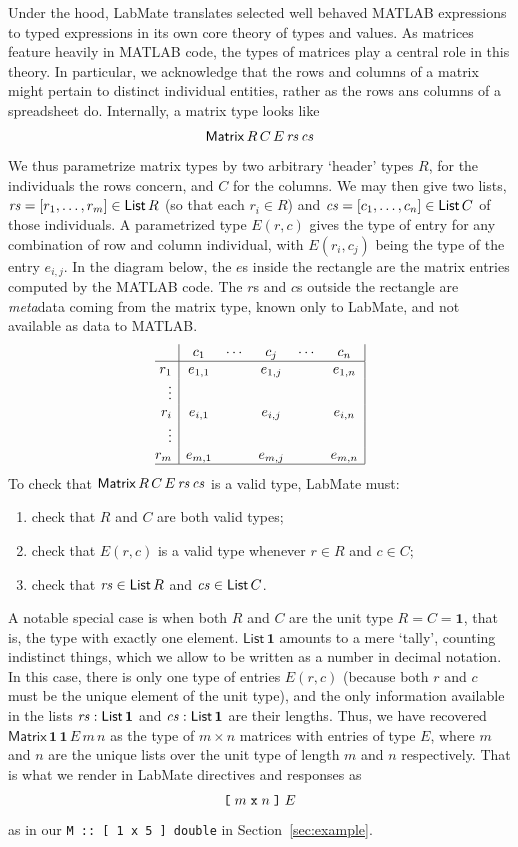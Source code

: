 \documentclass{IMEKO2024}
\newcommand{\lsb}{\texttt{\symbol{91}}}
\newcommand{\rsb}{\texttt{\symbol{93}}}
\newcommand{\One}{\mathbf{1}}
\newcommand{\Matrix}[5]{\mathsf{Matrix}\,#1\,#2\,#3\,#4\,#5}
\newcommand{\List}[1]{\mathsf{List}\,#1}
\newcommand{\remph}{\emph}
\newcommand{\param}{parametrize}
\begin{document}
Under the hood, LabMate translates selected well behaved MATLAB expressions
to typed expressions in its own core theory of types and values.
%
As matrices feature heavily in MATLAB code, the types of matrices
play a central role in this theory.
%
In particular, we acknowledge that the rows and columns of a matrix might pertain to distinct individual entities, rather as the rows ans columns of a spreadsheet do.
%
Internally, a matrix type looks like
\[\Matrix{R}{C}{E}{\rs}{\cs}
\]
%
We thus \param{} matrix types by two arbitrary `header' types $R$, for the individuals the rows concern, and $C$ for the columns. We may then give two lists, $\rs = [r_1,\ldots,r_m]\in\List{R}$ (so that each $r_i\in R$) and $\cs = [c_1,\ldots,c_n]\in\List{C}$ of those individuals. A \param{}d type $E(r,c)$ gives the type of entry for any combination of row and column individual, with $E(r_i,c_j)$ being the type of the entry $e_{i,j}$. In the diagram below, the $e$s inside the rectangle are the matrix entries computed by the MATLAB code. The $r$s and $c$s outside the rectangle are \remph{meta}data coming from the matrix type, known only to LabMate, and not available as data to MATLAB.
\[\begin{array}{@{}r|ccccc|}
\; & c_1      & \cdots & c_j     & \cdots & c_n     \\
\hline
r_1    & e_{1,1}  &        & e_{1,j} &        & e_{1,n} \\
\vdots &          &        &         &        &         \\
r_i    & e_{i,1}  &        & e_{i,j} &        & e_{i,n} \\
\vdots &          &        &         &        &         \\
r_m    & e_{m,1}  &        & e_{m,j} &        & e_{m,n}  \\
\hline
\end{array}\]
To check that $\Matrix{R}{C}{E}{\rs}{\cs}$ is a valid type, LabMate must:
\begin{enumerate}
\item check that $R$ and $C$ are both valid types;
\item check that $E(r,c)$ is a valid type whenever $r\in R$ and $c\in C$;
\item check that $\rs\in\List{R}$ and $\cs\in\List{C}$.
\end{enumerate}

A notable special case is when both $R$ and $C$ are the unit type $R = C = \One$, that is, the type with exactly one element.
%
$\List{\One}$ amounts to a mere `tally', counting indistinct things, which we allow to be written as a number in decimal notation.
%
In this case, there is only one type of entries $E(r,c)$ (because both $r$
and $c$ must be the unique element of the unit type), and the only
information available in the lists $\rs : \List{\One}$ and
$\cs : \List{\One}$ are their lengths.
%
Thus, we have recovered $\Matrix{\One}{\One}{E}{m}{n}$ as the type of
$m \times n$ matrices with entries of type $E$, where $m$ and $n$ are
the unique lists over the unit type of length $m$ and $n$
respectively.
%
That is what we render in LabMate directives and responses as
\[
\lsb \;m \;\texttt{x}\; n\; \rsb\; E
\]
as in our \texttt{M :: [ 1 x 5 ] double} in Section~\ref{sec:example}.
\end{document}
